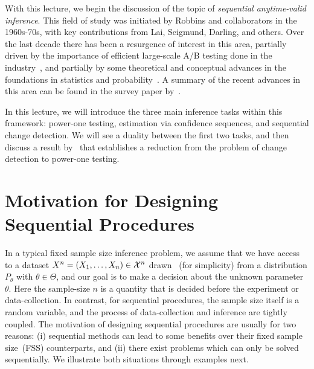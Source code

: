 \documentclass[12pt]{article}
\begin{document}
	\MakeScribeTop
With this lecture, we begin the discussion of the topic of \emph{sequential anytime-valid inference}. This field of study was initiated by Robbins and collaborators in the 1960s-70s, with key contributions from Lai, Seigmund, Darling, and others. Over the last decade there has been a resurgence  of interest in this area, partially driven by the importance of efficient large-scale A/B testing done in the industry~\citep{johari2015always}, and partially by some theoretical and conceptual advances in the foundations in statistics and probability~\citep{shafer2019game}.  A summary of the recent advances in this area can be found in the survey paper by~\citet{ramdas2023game}. 

In this lecture, we will introduce the three main inference tasks within this framework: power-one testing, estimation via confidence sequences, and sequential change detection. We will see a duality between the first two tasks, and then discuss a result by~\citet{lorden1971procedures} that establishes a reduction from the problem of change detection to power-one testing. 


\section{Motivation for Designing Sequential Procedures}
\label{sec:motivation-seq-inference}
In a typical fixed sample size inference problem, we assume that we have access to a dataset $X^n = (X_1, \ldots, X_n) \in {\cal X}^n$ drawn \iid~(for simplicity) from a distribution $P_\theta$ with $\theta \in \Theta$, and our goal is to make a decision about the unknown parameter $\theta$. Here the sample-size $n$ is a quantity that is decided before the experiment or data-collection. In contrast, for sequential procedures, the sample size itself is a random variable, and the process of data-collection and inference are tightly coupled.  The motivation of designing sequential procedures are usually for two reasons: (i) sequential methods can lead to some benefits over their fixed sample size~(FSS) counterparts, and (ii) there exist problems which can only be solved sequentially. We illustrate both situations through examples next. 
\end{document}
